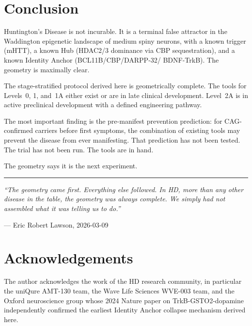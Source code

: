 \documentclass[12pt,a4paper]{article}
\begin{document}
\section{Conclusion}

Huntington's Disease is not incurable. It is a terminal
false attractor in the Waddington epigenetic landscape of
medium spiny neurons, with a known trigger (mHTT), a known
Hub (HDAC2/3 dominance via CBP sequestration), and a known
Identity Anchor (BCL11B\slash CBP\slash DARPP-32\slash
BDNF-TrkB). The geometry is maximally clear.

The stage-stratified protocol derived here is geometrically
complete. The tools for Levels~0, 1, and~1A either exist
or are in late clinical development. Level~2A is in active
preclinical development with a defined engineering pathway.

The most important finding is the pre-manifest prevention
prediction: for CAG-confirmed carriers before first
symptoms, the combination of existing tools may prevent the
disease from ever manifesting. That prediction has not been
tested. The trial has not been run. The tools are in hand.

The geometry says it is the next experiment.

\bigskip\noindent\rule{\linewidth}{0.5pt}

\medskip
\noindent\textit{``The geometry came first. Everything else
followed. In HD, more than any other disease in the table,
the geometry was always complete. We simply had not
assembled what it was telling us to do.''}

\medskip\noindent\hfill--- Eric Robert Lawson, 2026-03-09

\section*{Acknowledgements}

The author acknowledges the work of the HD research
community, in particular the uniQure AMT-130 team, the
Wave Life Sciences WVE-003 team, and the Oxford
neuroscience group whose 2024 Nature paper on
TrkB-GSTO2-dopamine independently confirmed the earliest
Identity Anchor collapse mechanism derived here.

\end{document}
